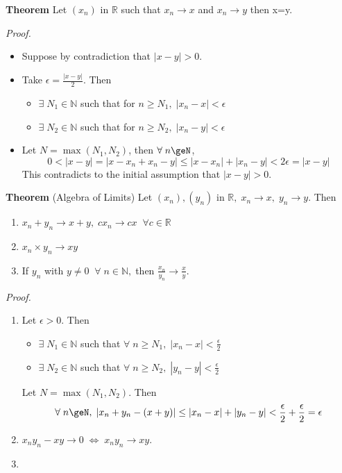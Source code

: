 \documentclass[12pt]{article}
\begin{document}
\vspace{1.5\baselineskip}
\begin{block}{\bf Theorem} Let $(x_n)$ in $\mathbb{R}$ such that $x_n\to x$ and $x_n\to y$ then x=y.\end{block}

\vspace{1\baselineskip}
\begin{block}{\sl Proof.} 
\begin{itemize}
    \item Suppose by contradiction that $|x-y|>0$.
    \item Take $\epsilon=\frac{|x-y|}{2}$. Then
    \begin{itemize}
        \item $\exists\;N_1\in\mathbb{N}$ such that for $n\ge N_1,\;|x_n-x|<\epsilon$
        \item $\exists\;N_2\in\mathbb{N}$ such that for $n\ge N_2,\;|x_n-y|<\epsilon$
    \end{itemize}
    \item Let $N= \max(N_1,N_2)$, then $\forall\;n\geN$,
    $$0<|x-y| = |x-x_n+x_n-y| \le |x-x_n|+|x_n-y|<2\epsilon = |x-y|$$
    This contradicts to the initial assumption that $|x-y|>0$.
\end{itemize}
\end{block}

\newpage
\begin{block}{\bf Theorem} (Algebra of Limits) Let $(x_n), (y_n)$ in $\mathbb{R},\; x_n\to x,\; y_n\to y$. Then
\begin{enumerate}[label=(\roman*)]
    \item $x_n+y_n \to x+y,\; cx_n\to cx\;\;\forall c\in\mathbb{R}$
    \item $x_n\times y_n \to xy$
    \item If $y_n$ with $y\neq 0\;\;\forall\;n\in\mathbb{N},\;$then $\frac{x_n}{y_n}\to \frac{x}{y}.$
\end{enumerate}
\end{block}

\vspace{1\baselineskip}
\begin{block}{\sl Proof.}
\begin{enumerate}[label=(\roman*)]
    \item Let $\epsilon >0$. Then 
    \begin{itemize}
        \item $\exists\;N_1\in\mathbb{N}$ such that $\forall\;n\ge N_1,\;|x_n-x|<\frac{\epsilon}{2}$
        \item $\exists\;N_2\in\mathbb{N}$ such that $\forall\;n\ge N_2,\;|y_n-y|<\frac{\epsilon}{2}$
    \end{itemize}
    Let $N=\max(N_1,N_2)$. Then 
    $$\forall\;n\geN,\;|x_n+y_n-(x+y)|\le |x_n-x|+|y_n-y|<\frac{\epsilon}{2}+\frac{\epsilon}{2}=\epsilon$$
    
    \item $x_ny_n - xy \to 0\;\Leftrightarrow\; x_ny_n\to xy$.
    \item 
\end{enumerate}
\end{block}
\end{document}
